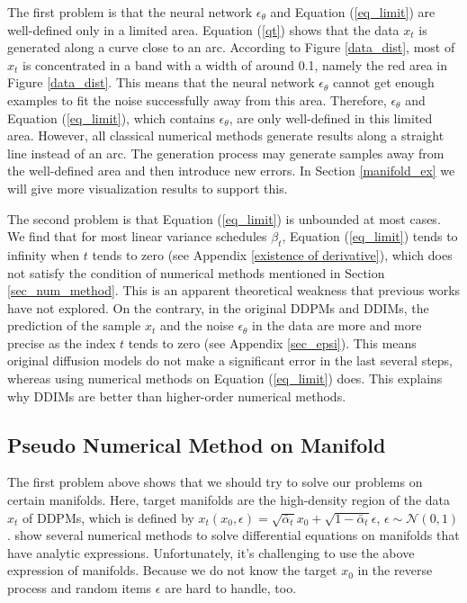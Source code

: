 \documentclass{article}
\begin{document}
The first problem is that the neural network $\epsilon_\theta$ and Equation (\ref{eq_limit}) are well-defined only in a limited area. Equation (\ref{qt}) shows that the data $x_t$ is generated along a curve close to an arc. According to Figure \ref{data_dist}, most of $x_t$ is concentrated in a band with a width of around 0.1, namely the red area in Figure \ref{data_dist}. This means that the neural network $\epsilon_\theta$ cannot get enough examples to fit the noise successfully away from this area. Therefore, $\epsilon_\theta$ and Equation (\ref{eq_limit}), which contains $\epsilon_\theta$, are only well-defined in this limited area. However, all classical numerical methods generate results along a straight line instead of an arc. The generation process may generate samples away from the well-defined area and then introduce new errors. In Section \ref{manifold_ex} we will give more visualization results to support this.

The second problem is that Equation (\ref{eq_limit}) is unbounded at most cases. We find that for most linear variance schedules $\beta_t$, Equation (\ref{eq_limit}) tends to infinity when $t$ tends to zero (see Appendix \ref{existence of derivative}), which does not satisfy the condition of numerical methods mentioned in Section \ref{sec_num_method}. This is an apparent theoretical weakness that previous works have not explored. On the contrary, in the original DDPMs and DDIMs, the prediction of the sample $x_t$ and the noise $\epsilon_\theta$ in the data are more and more precise as the index $t$ tends to zero (see Appendix \ref{sec_epsi}). This means original diffusion models do not make a significant error in the last several steps, whereas using numerical methods on Equation (\ref{eq_limit}) does. This explains why DDIMs are better than higher-order numerical methods.




\subsection{Pseudo Numerical Method on Manifold}
\label{sec_pseudo}

The first problem above shows that we should try to solve our problems on certain manifolds. Here, target manifolds are the high-density region of the data $x_t$ of DDPMs, which is defined by $x_t(x_0, \epsilon)= \sqrt{\bar{\alpha}_t}x_0 + \sqrt{1-\bar{\alpha}_t}\epsilon$, $\epsilon\sim \mathcal{N}(0,1)$.  \citet{Hairer1996} show several numerical methods to solve differential equations on manifolds that have analytic expressions. Unfortunately, it's challenging to use the above expression of manifolds. Because we do not know the target $x_0$ in the reverse process and random items $\epsilon$ are hard to handle, too. 
\end{document}
